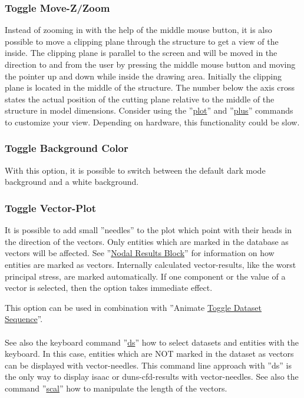 \documentclass{article}
\providecommand{\htmlref}[2]{\hyperref[#2]{#1}}
\begin{document}
\subsubsection{\label{Toggle Move-Z/Zoom}Toggle Move-Z/Zoom}
Instead of zooming in with the help of the middle mouse button, it is also possible to move a clipping plane through the structure to get a view of the inside. The clipping plane is parallel to the screen and will be moved in the direction to and from the user by pressing the middle mouse button and moving the pointer up and down while inside the drawing area. Initially the clipping plane is located in the middle of the structure. The number below the axis cross states the actual position of the cutting plane relative to the middle of the structure in model dimensions. Consider using the ''\htmlref{plot}{plot}'' and ''\htmlref{plus}{plus}'' commands to customize your view. Depending on hardware, this functionality could be slow. 

\subsubsection{\label{Toggle Background Color}Toggle Background Color}
With this option, it is possible to switch between the default dark mode background and a white background.

\subsubsection{\label{Toggle Vector-Plot}Toggle Vector-Plot}
It is possible to add small ''needles'' to the plot which point with their heads in the direction of the vectors. Only entities which are marked in the database as vectors will be affected. See ''\htmlref{Nodal Results Block}{Nodal Results Block}'' for information on how entities are marked as vectors. Internally calculated vector-results, like the worst principal stress, are marked automatically. If one component or the value of a vector is selected, then the option takes immediate effect.

This option can be used in combination with ''Animate \htmlref{Toggle Dataset Sequence}{Toggle Dataset Sequence}''.\\\\See also the keyboard command ''\htmlref{ds}{ds}'' how to select datasets and entities with the keyboard. In this case, entities which are NOT marked in the dataset as vectors can be displayed with vector-needles. This command line approach with ''ds'' is the only way to display isaac or duns-cfd-results with vector-needles. See also the command ''\htmlref{scal}{scal}'' how to manipulate the length of the vectors.  
\end{document}
